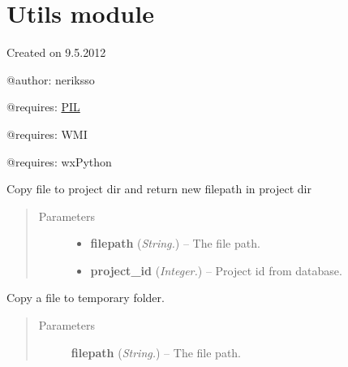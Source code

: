 \documentclass[letterpaper,10pt,english]{sphinxmanual}
\begin{document}
\section{Utils module}
\label{api:utils-module}\label{api:module-utils}
Created on 9.5.2012

@author: neriksso

@requires: \href{http://www.pythonware.com/products/pil/}{PIL}

@requires: WMI

@requires: wxPython

\begin{fulllineitems}
\label{api:utils.CopyFileToProject}
Copy file to project dir and return new filepath in project dir
\begin{quote}\begin{description}
\item[{Parameters}] \leavevmode\begin{itemize}
\item {} 
\textbf{filepath} (\emph{String.}) -- The file path.

\item {} 
\textbf{project\_id} (\emph{Integer.}) -- Project id from database.

\end{itemize}

\end{description}\end{quote}

\end{fulllineitems}


\begin{fulllineitems}
\label{api:utils.CopyToTemp}
Copy a file to temporary folder.
\begin{quote}\begin{description}
\item[{Parameters}] \leavevmode
\textbf{filepath} (\emph{String.}) -- The file path.

\end{description}\end{quote}

\end{fulllineitems}
\end{document}
